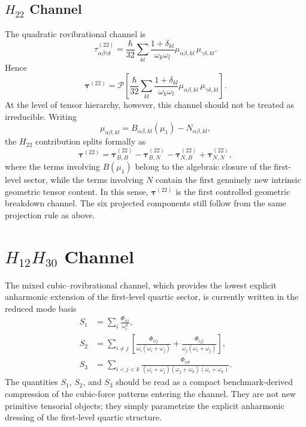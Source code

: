\documentclass[aip,jcp,reprint]{revtex4-2}
\begin{document}
\begin{widetext}
\subsection{$H_{22}$ Channel}
The quadratic rovibrational channel is
\begin{equation}
\tau^{(22)}_{\alpha\beta\gamma\delta}
=
\frac{\hbar}{32}
\sum_{kl}
\frac{1+\delta_{kl}}{\omega_k\omega_l}
\mu_{\alpha\beta,kl}\,\mu_{\gamma\delta,kl}.
\end{equation}
Hence
\begin{equation}
\bm{\tau}^{(22)} = \mathcal{P}\!\left[
\frac{\hbar}{32}
\sum_{kl}
\frac{1+\delta_{kl}}{\omega_k\omega_l}
\mu_{\alpha\beta,kl}\,\mu_{\gamma\delta,kl}
\right].
\end{equation}
At the level of tensor hierarchy, however, this channel should not be
treated as irreducible. Writing
\begin{equation}
\mu_{\alpha\beta,kl} = B_{\alpha\beta,kl}(\mu_1) - N_{\alpha\beta,kl},
\end{equation}
the $H_{22}$ contribution splits formally as
\begin{equation}
\bm{\tau}^{(22)}
=
\bm{\tau}^{(22)}_{B,B}
-\bm{\tau}^{(22)}_{B,N}
-\bm{\tau}^{(22)}_{N,B}
+\bm{\tau}^{(22)}_{N,N},
\label{eq:paper2_h22_split}
\end{equation}
where the terms involving $B(\mu_1)$ belong to the algebraic closure of
the first-level sector, while the terms involving $N$ contain the first
genuinely new intrinsic geometric tensor content.  In this sense,
$\bm{\tau}^{(22)}$ is the first controlled geometric breakdown channel.
The six projected components still follow from the same projection rule
as above.

\section{$H_{12}H_{30}$ Channel}
The mixed cubic--rovibrational channel, which provides the lowest explicit
anharmonic extension of the first-level quartic sector, is currently
written in the reduced mode basis
\begin{align}
S_1 &= \sum_i \frac{\Phi_{iii}}{\omega_i^2}, \\
S_2 &= \sum_{i\neq j}
\left[
\frac{\Phi_{iij}}{\omega_i(\omega_i+\omega_j)} +
\frac{\Phi_{ijj}}{\omega_j(\omega_i+\omega_j)}
\right], \\
S_3 &= \sum_{i<j<k}
\frac{\Phi_{ijk}}{(\omega_i+\omega_j)(\omega_j+\omega_k)(\omega_i+\omega_k)}.
\end{align}
The quantities $S_1$, $S_2$, and $S_3$ should be read as a compact
benchmark-derived compression of the cubic-force patterns entering the
channel. They are not new primitive tensorial objects; they simply
parametrize the explicit anharmonic dressing of the first-level quartic
structure.


\end{widetext}
\end{document}
